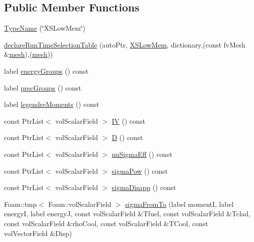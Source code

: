 \subsection*{Public Member Functions}
\begin{DoxyCompactItemize}
\item 
\hyperlink{classFoam_1_1XSLowMem_a2c6c5049c84b55ab979c78c6ae9fe47e}{Type\+Name} (\char`\"{}X\+S\+Low\+Mem\char`\"{})
\item 
\hyperlink{classFoam_1_1XSLowMem_ab6ad4c644ede1abff3f4ddf6ad5313ef}{declare\+Run\+Time\+Selection\+Table} (auto\+Ptr, \hyperlink{classFoam_1_1XSLowMem}{X\+S\+Low\+Mem}, dictionary,(const fv\+Mesh \&\hyperlink{createMeshesPostProcess_8H_a8bb1e58291d2d2b653e024a4f4bffe38}{mesh}),(\hyperlink{createMeshesPostProcess_8H_a8bb1e58291d2d2b653e024a4f4bffe38}{mesh}))
\item 
label \hyperlink{classFoam_1_1XSLowMem_a4ac79b302698620f0566eac803ba02d3}{energy\+Groups} () const
\item 
label \hyperlink{classFoam_1_1XSLowMem_aeb1380355ff0a9cc7ab7e8b55aea673b}{prec\+Groups} () const
\item 
label \hyperlink{classFoam_1_1XSLowMem_ab1770d82e9777642e1373706c733606d}{legendre\+Moments} () const
\item 
const Ptr\+List$<$ vol\+Scalar\+Field $>$ \hyperlink{classFoam_1_1XSLowMem_af7bd963d20dabfe2e8c89aefe489694a}{IV} () const
\item 
const Ptr\+List$<$ vol\+Scalar\+Field $>$ \hyperlink{classFoam_1_1XSLowMem_a183948adfa6649ba954e96d3ff1fb262}{D} () const
\item 
const Ptr\+List$<$ vol\+Scalar\+Field $>$ \hyperlink{classFoam_1_1XSLowMem_a2d54b65ba527abfbece66dee3572e935}{nu\+Sigma\+Eff} () const
\item 
const Ptr\+List$<$ vol\+Scalar\+Field $>$ \hyperlink{classFoam_1_1XSLowMem_aa3757df4a20f8fb067a76e9acb069849}{sigma\+Pow} () const
\item 
const Ptr\+List$<$ vol\+Scalar\+Field $>$ \hyperlink{classFoam_1_1XSLowMem_aa09312f1afef2b2c3841e527175493b0}{sigma\+Disapp} () const
\item 
Foam\+::tmp$<$ Foam\+::vol\+Scalar\+Field $>$ \hyperlink{classFoam_1_1XSLowMem_a5e92a118fd121e563136851e42857d63}{sigma\+From\+To} (label momentI, label energyI, label energyJ, const vol\+Scalar\+Field \&Tfuel, const vol\+Scalar\+Field \&Tclad, const vol\+Scalar\+Field \&rho\+Cool, const vol\+Scalar\+Field \&T\+Cool, const vol\+Vector\+Field \&Disp)
\item 

\end{DoxyCompactItemize}
